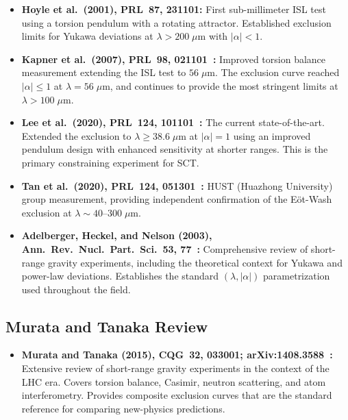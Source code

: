 \documentclass[11pt,a4paper]{article}
\begin{document}
\begin{itemize}[leftmargin=2em]
  \item \textbf{Hoyle et al.\ (2001), PRL~87, 231101:}
    First sub-millimeter ISL test using a torsion pendulum with a rotating
    attractor. Established exclusion limits for Yukawa deviations at
    $\lambda > 200\;\mu$m with $|\alpha| < 1$.

  \item \textbf{Kapner et al.\ (2007), PRL~98, 021101~\cite{kapner2007}:}
    Improved torsion balance measurement extending the ISL test to
    $56\;\mu$m. The exclusion curve reached $|\alpha| \leq 1$ at
    $\lambda = 56\;\mu$m, and continues to provide the most stringent
    limits at $\lambda > 100\;\mu$m.

  \item \textbf{Lee et al.\ (2020), PRL~124, 101101~\cite{lee2020}:}
    The current state-of-the-art. Extended the exclusion to
    $\lambda \geq 38.6\;\mu$m at $|\alpha| = 1$ using an improved pendulum
    design with enhanced sensitivity at shorter ranges. This is the primary
    constraining experiment for SCT.

  \item \textbf{Tan et al.\ (2020), PRL~124, 051301~\cite{tan2020}:}
    HUST (Huazhong University) group measurement, providing independent
    confirmation of the E\"ot-Wash exclusion at $\lambda \sim 40$--$300\;\mu$m.

  \item \textbf{Adelberger, Heckel, and Nelson (2003),
    Ann.\ Rev.\ Nucl.\ Part.\ Sci.~53, 77~\cite{adelberger2003}:}
    Comprehensive review of short-range gravity experiments, including
    the theoretical context for Yukawa and power-law deviations.
    Establishes the standard $(\lambda, |\alpha|)$ parametrization used
    throughout the field.
\end{itemize}

\subsection{Murata and Tanaka Review}

\begin{itemize}[leftmargin=2em]
  \item \textbf{Murata and Tanaka (2015), CQG~32, 033001;
    arXiv:1408.3588~\cite{murata2015}:}
    Extensive review of short-range gravity experiments in the context of
    the LHC era. Covers torsion balance, Casimir, neutron scattering,
    and atom interferometry. Provides composite exclusion curves that are
    the standard reference for comparing new-physics predictions.
\end{itemize}
\end{document}
